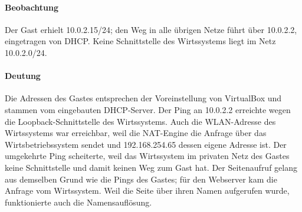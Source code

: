 \begin{messung}






\paragraph{Beobachtung} Der Gast erhielt 10.0.2.15/24; den Weg in alle übrigen Netze führt  über 10.0.2.2, eingetragen von DHCP. Keine Schnittstelle des Wirtssystems liegt im Netz 10.0.2.0/24.

\paragraph{Deutung} Die Adressen des Gastes entsprechen der Voreinstellung von VirtualBox und stammen vom eingebauten DHCP-Server. Der Ping an 10.0.2.2 erreichte wegen  die Loopback-Schnittstelle des Wirtssystems. Auch die WLAN-Adresse des Wirtssystems war erreichbar, weil die NAT-Engine die Anfrage über das Wirtsbetriebssystem sendet und 192.168.254.65 dessen eigene Adresse ist. Der umgekehrte Ping scheiterte, weil das Wirtssystem im privaten Netz des Gastes keine Schnittstelle und damit keinen Weg zum Gast hat. Der Seitenaufruf gelang aus demselben Grund wie die Pings des Gastes; für den Webserver kam die Anfrage vom Wirtssystem. Weil die Seite über ihren Namen aufgerufen wurde, funktionierte auch die Namensauflösung.
\end{messung}

